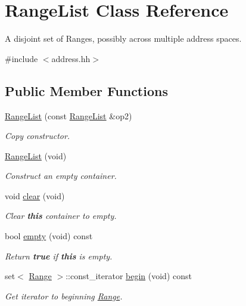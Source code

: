 \hypertarget{class_range_list}{}\section{Range\+List Class Reference}
\label{class_range_list}


A disjoint set of Ranges, possibly across multiple address spaces.  




{\ttfamily \#include $<$address.\+hh$>$}

\subsection*{Public Member Functions}
\begin{DoxyCompactItemize}
\item 
\mbox{\hyperlink{class_range_list_ae8b5850c722bc4e7b612d87ca6a43fab}{Range\+List}} (const \mbox{\hyperlink{class_range_list}{Range\+List}} \&op2)
\begin{DoxyCompactList}\small\item\em Copy constructor. \end{DoxyCompactList}\item 
\mbox{\hyperlink{class_range_list_a2138ead753fe147949be8b725f1ee89b}{Range\+List}} (void)
\begin{DoxyCompactList}\small\item\em Construct an empty container. \end{DoxyCompactList}\item 
void \mbox{\hyperlink{class_range_list_afab3e451530bb1f7c8c1bd66a7df32a5}{clear}} (void)
\begin{DoxyCompactList}\small\item\em Clear {\bfseries{this}} container to empty. \end{DoxyCompactList}\item 
bool \mbox{\hyperlink{class_range_list_ad78a4eba9787c374803f2503fdd38f3c}{empty}} (void) const
\begin{DoxyCompactList}\small\item\em Return {\bfseries{true}} if {\bfseries{this}} is empty. \end{DoxyCompactList}\item 
set$<$ \mbox{\hyperlink{class_range}{Range}} $>$\+::const\+\_\+iterator \mbox{\hyperlink{class_range_list_a890040e91f6bf573706b76a185ab6cbe}{begin}} (void) const
\begin{DoxyCompactList}\small\item\em Get iterator to beginning \mbox{\hyperlink{class_range}{Range}}. \end{DoxyCompactList}\item 

\end{DoxyCompactItemize}
